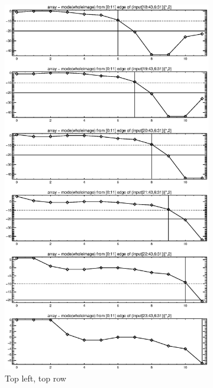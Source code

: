 \documentclass[10pt]{article}
\begin{document}
\begin{figure}[!h]
    \centering 
    \hspace{-1.0in}
    \begin{subfigure}[b]{.4\linewidth}
        \centering
        \includegraphics[width=1.4\textwidth]{../plots_tables_images/topright2.eps} 
        \caption{Top left, top row}
    \end{subfigure}
    \hspace{1.0in}
    \begin{subfigure}[b]{.4\linewidth}

\end{subfigure}
\end{figure}
\end{document}

